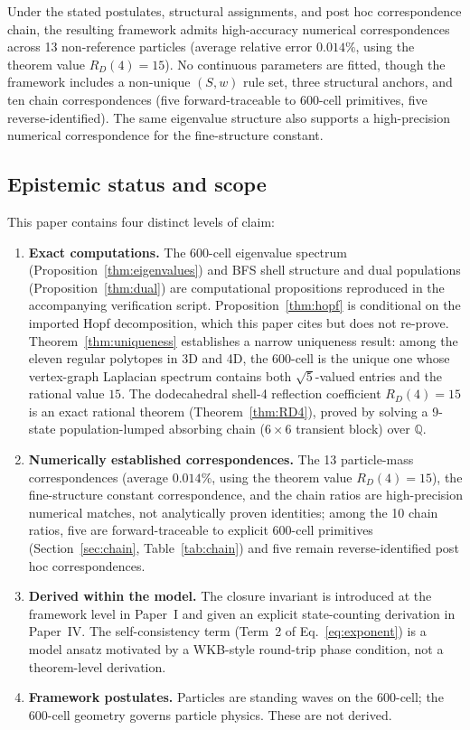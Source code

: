 \documentclass[12pt]{article}
\begin{document}
Under the stated postulates, structural assignments, and post hoc correspondence chain, the resulting framework admits high-accuracy numerical correspondences across 13 non-reference particles (average relative error $0.014\%$, using the theorem value $R_D(4) = 15$). No continuous parameters are fitted, though the framework includes a non-unique $(S,w)$ rule set, three structural anchors, and ten chain correspondences (five forward-traceable to 600-cell primitives, five reverse-identified). The same eigenvalue structure also supports a high-precision numerical correspondence for the fine-structure constant.

\subsection*{Epistemic status and scope}

This paper contains four distinct levels of claim:

\begin{enumerate}
    \item \textbf{Exact computations.} The 600-cell eigenvalue spectrum (Proposition~\ref{thm:eigenvalues}) and BFS shell structure and dual populations (Proposition~\ref{thm:dual}) are computational propositions reproduced in the accompanying verification script. Proposition~\ref{thm:hopf} is conditional on the imported Hopf decomposition, which this paper cites but does not re-prove. Theorem~\ref{thm:uniqueness} establishes a narrow uniqueness result: among the eleven regular polytopes in 3D and 4D, the 600-cell is the unique one whose vertex-graph Laplacian spectrum contains both $\sqrt{5}$-valued entries and the rational value $15$. The dodecahedral shell-4 reflection coefficient $R_D(4) = 15$ is an exact rational theorem (Theorem~\ref{thm:RD4}), proved by solving a 9-state population-lumped absorbing chain ($6 \times 6$ transient block) over $\mathbb{Q}$.
    \item \textbf{Numerically established correspondences.} The 13 particle-mass correspondences (average $0.014\%$, using the theorem value $R_D(4) = 15$), the fine-structure constant correspondence, and the chain ratios are high-precision numerical matches, not analytically proven identities; among the 10 chain ratios, five are forward-traceable to explicit 600-cell primitives (Section~\ref{sec:chain}, Table~\ref{tab:chain}) and five remain reverse-identified post hoc correspondences.
    \item \textbf{Derived within the model.} The closure invariant is introduced at the framework level in Paper~I and given an explicit state-counting derivation in Paper~IV. The self-consistency term (Term~2 of Eq.~\eqref{eq:exponent}) is a model ansatz motivated by a WKB-style round-trip phase condition, not a theorem-level derivation.
    \item \textbf{Framework postulates.} Particles are standing waves on the 600-cell; the 600-cell geometry governs particle physics. These are not derived.
\end{enumerate}
\end{document}
